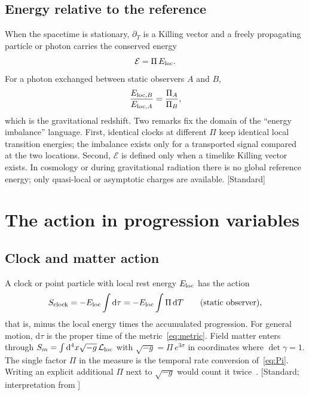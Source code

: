 \documentclass[11pt]{article}
\newcommand{\Pg}{\Pi}                 %
\newcommand{\sgP}{\sigma}             %
\newcommand{\Eloc}{E_{\rm loc}}       %
\newcommand{\Eref}{\mathcal{E}}       %
\newcommand{\dd}{\mathrm{d}}
\newcommand{\Tref}{T}                 %
\newcommand{\st}[1]{\textsf{\small[#1]}}
\theoremstyle{plain}
\theoremstyle{definition}
\theoremstyle{remark}
\begin{document}
\subsection{Energy relative to the reference}

When the spacetime is stationary, $\partial_\Tref$ is a Killing vector and a freely propagating particle or photon carries the conserved energy
\begin{equation}
\Eref = \Pg\,\Eloc .
\label{eq:Killing}
\end{equation}
For a photon exchanged between static observers $A$ and $B$,
\begin{equation}
\frac{E_{{\rm loc},B}}{E_{{\rm loc},A}} = \frac{\Pg_A}{\Pg_B},
\end{equation}
which is the gravitational redshift. Two remarks fix the domain of the ``energy imbalance'' language. First, identical clocks at different $\Pg$ keep identical local transition energies; the imbalance exists only for a transported signal compared at the two locations. Second, $\Eref$ is defined only when a timelike Killing vector exists. In cosmology or during gravitational radiation there is no global reference energy; only quasi-local or asymptotic charges are available. \st{Standard}

\section{The action in progression variables}
\label{sec:action}

\subsection{Clock and matter action}

A clock or point particle with local rest energy $\Eloc$ has the action
\begin{equation}
S_{\rm clock} = -\Eloc\int \dd\tau = -\Eloc\int \Pg\,\dd\Tref\qquad(\text{static observer}),
\label{eq:clockaction}
\end{equation}
that is, minus the local energy times the accumulated progression. For general motion, $\dd\tau$ is the proper time of the metric~\eqref{eq:metric}. Field matter enters through $S_m=\int \dd^4x\sqrt{-g}\,\mathcal L_{\rm loc}$ with $\sqrt{-g}=\Pg\,e^{3\sgP}$ in coordinates where $\det\gamma=1$. The single factor $\Pg$ in the measure is the temporal rate conversion of~\eqref{eq:Pi}. Writing an explicit additional $\Pg$ next to $\sqrt{-g}$ would count it twice~\cite{JordanHDA}. \st{Standard; interpretation from \cite{JordanHDA}}
\end{document}
